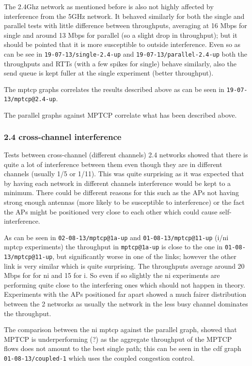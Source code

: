 \documentclass[12pt,a4paper]{article}
\begin{document}
The 2.4Ghz network as mentioned before is also not highly affected by
interference from the 5GHz network. It behaved similarly for both the single and
parallel tests with little difference between throughputs, averaging at 16 Mbps
for single and around 13 Mbps for parallel (so a slight drop in throughput); but
it should be pointed that it is more susceptible to outside interference. Even
so as can be see in \texttt{19-07-13/single-2.4-up} and
\texttt{19-07-13/parallel-2.4-up} both the throughputs and RTTs (with a few
spikes for single) behave similarly, also the send queue is kept fuller at the
single experiment (better throughput).

The mptcp graphs correlates the results described above as can be seen in
\texttt{19-07-13/mptcp@2.4-up}.

The parallel graphs against MPTCP correlate what has been described above.

\subsubsection{2.4 cross-channel interference}
Tests between cross-channel (different channels) 2.4 networks showed that there
is quite a lot of interference between them even though they are in different
channels (usually 1/5 or 1/11). This was quite surprising as it was expected
that by having each network in different channels interference would be kept to
a minimum. There could be different reasons for this such as the APs not having
strong enough antennas (more likely to be susceptible to interference) or the
fact the APs might be positioned very close to each other which could cause
self-interference.

As can be seen in \texttt{02-08-13/mptcp@1a-up} and
\texttt{01-08-13/mptcp@11-up} (i/ni mptcp experiments) the throughput in
\texttt{mptcp@1a-up} is close to the one in \texttt{01-08-13/mptcp@11-up}, but
significantly worse in one of the links; however the other link is very similar
which is quite surprising. The throughputs average around 20 Mbps for for ni and
15 for i. So even if so slightly the ni experiments are performing quite close
to the interfering ones which should not happen in theory. Experiments with the
APs positioned far apart showed a much fairer distribution between the 2
networks as usually the network in the less busy channel dominates the
throughput.

The comparison between the ni mptcp against the parallel graph, showed that
MPTCP is underperforming (?) as the aggregate throughput of the MPTCP flows does
not amount to the best single path; this can be seen in the cdf graph
\texttt{01-08-13/coupled-1} which uses the coupled congestion control.
\end{document}
